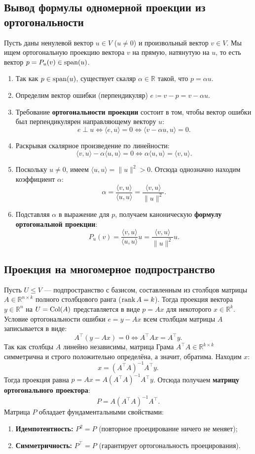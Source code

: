 \subsection{Вывод формулы одномерной проекции из ортогональности}
Пусть даны ненулевой вектор $u \in V$ ($u \ne 0$) и произвольный вектор $v \in V$.
Мы ищем ортогональную проекцию вектора $v$ на прямую, натянутую на $u$, то есть вектор $p = P_u(v) \in \operatorname{span}(u)$.
\begin{enumerate}
    \item Так как $p \in \operatorname{span}(u)$, существует скаляр $\alpha \in \mathbb{R}$ такой, что $p = \alpha u$.
    \item Определим вектор ошибки (перпендикуляр) $e \coloneqq v - p = v - \alpha u$.
    \item Требование \textbf{ортогональности проекции} состоит в том, чтобы вектор ошибки был перпендикулярен
    направляющему вектору $u$:
    \[ e \perp u \iff \langle e, u \rangle = 0 \iff \langle v - \alpha u, u \rangle = 0. \]
    \item Раскрывая скалярное произведение по линейности:
    \[ \langle v, u \rangle - \alpha \langle u, u \rangle = 0 \iff \alpha \langle u, u \rangle = \langle v, u
    \rangle. \]
    \item Поскольку $u \ne 0$, имеем $\langle u, u \rangle = \|u\|^2 > 0$.
    Отсюда однозначно находим коэффициент $\alpha$:
    \[ \alpha = \frac{\langle v, u \rangle}{\langle u, u \rangle} = \frac{\langle v, u \rangle}{\|u\|^2}. \]
    \item Подставляя $\alpha$ в выражение для $p$, получаем каноническую \textbf{формулу ортогональной проекции}:
    \[ P_u(v) = \frac{\langle v, u \rangle}{\langle u, u \rangle} u = \frac{\langle v, u \rangle}{\|u\|^2} u. \]
\end{enumerate}

\subsection{Проекция на многомерное подпространство}
Пусть $U \le V$ — подпространство с базисом, составленным из столбцов матрицы $A\in \mathbb{R}^{n \times k}$ полного
столбцового ранга ($\operatorname{rank} A = k$).
Тогда проекция вектора $y \in \mathbb{R}^n$ на $U = \operatorname{Col}(A)$ представляется в виде $p = A x$ для некоторого $x \in
\mathbb{R}^k$.
Условие ортогональности ошибки $e = y - Ax$ всем столбцам матрицы $A$ записывается в виде:
\[ A^\top (y - Ax) = 0 \iff A^\top A x = A^\top y. \]
Так как столбцы $A$ линейно независимы, матрица Грама $A^\top A \in \mathbb{R}^{k \times k}$ симметрична и строго
положительно определёна, а значит, обратима.
Находим $x$:
\[ x = (A^\top A)^{-1} A^\top y. \]
Тогда проекция равна $p = A x = A (A^\top A)^{-1} A^\top y$.
Отсюда получаем \textbf{матрицу ортогонального проектора}:
\[ P = A (A^\top A)^{-1} A^\top. \]
Матрица $P$ обладает фундаментальными свойствами:
\begin{enumerate}
    \item \textbf{Идемпотентность:} $P^2 = P$ (повторное проецирование ничего не меняет);
    \item \textbf{Симметричность:} $P^\top = P$ (гарантирует ортогональность проецирования).
\end{enumerate}

